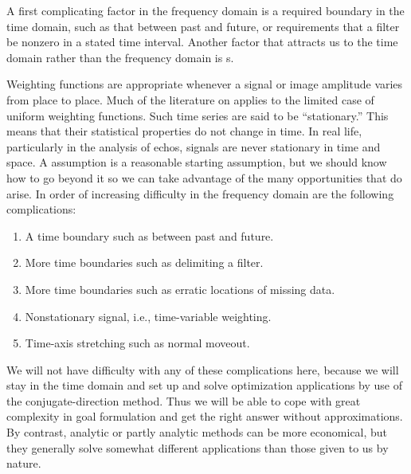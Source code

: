 \par
A first complicating factor in the frequency domain is a required boundary
in the time domain, such as that between past and future,
or requirements that a filter be nonzero in a stated time interval.
Another factor that attracts us to the time domain
rather than the frequency domain is s.
\par
Weighting functions
are appropriate whenever a signal or image amplitude varies
from place to place.
Much of the literature on 
applies to the limited case of uniform weighting functions.
Such time series are said to be ``stationary.''
This means that their statistical properties do not change in time.
In real life, particularly in the analysis of echos,
signals are never stationary in time and space.
A  assumption is a reasonable starting assumption,
but we should know how to go beyond it
so we can take advantage of the many opportunities that do arise.
In order of increasing difficulty in the frequency domain are
the following complications:
\begin{enumerate}
\item A time boundary such as between past and future.
\item More time boundaries such as delimiting a filter.
\item More time boundaries such as erratic locations of missing data.
\item Nonstationary signal, i.e., time-variable weighting.
\item Time-axis stretching such as normal moveout.
\end{enumerate}

\par
We will not have difficulty with any of these complications here,
because we will stay in the time domain
and set up and solve optimization applications by use of
the conjugate-direction method.
Thus we will be able to cope with great complexity in goal formulation
and get the right answer without approximations.
By contrast, analytic or partly analytic methods
can be more economical, but they generally solve
somewhat different applications than those given to us by nature.

